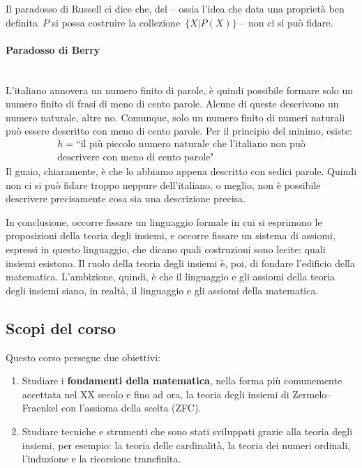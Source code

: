 Il paradosso di Russell ci dice che, del  -- ossia
l'idea che data una propriet\`a ben definita~$P$ si possa costruire la
collezione~$\{X | P(X)\}$ -- non ci si pu\`o fidare.

\paragraph*{Paradosso di Berry}\mbox{}\\
L'italiano annovera un numero finito di parole, \`e quindi possibile formare solo un numero finito di frasi di meno di cento parole. Alcune di queste descrivono un numero naturale, altre no. Comunque, solo un numero 
finito di numeri naturali pu\`o essere descritto con meno di cento parole. Per il principio del minimo, esiste:
\begin{align*}
	h = \text{``il pi\`u piccolo numero naturale che l'italiano non pu\`o} \\ 
 \text{descrivere con meno di cento parole"}
\end{align*}
Il guaio, chiaramente, \`e che lo abbiamo appena descritto con sedici parole.
Quindi non ci si pu\`o fidare troppo neppure dell'italiano, o meglio, non \`e possibile descrivere precisamente cosa sia una descrizione precisa.

In conclusione, occorre fissare un linguaggio formale in cui si esprimono le proposizioni della teoria degli insiemi, e occorre fissare un sistema di assiomi, espressi in questo linguaggio, che 
dicano quali costruzioni sono lecite: quali insiemi esistono. Il ruolo della teoria degli insiemi \`e, poi, di fondare l'edificio della matematica. L'ambizione, quindi, \`e che il linguaggio e gli assiomi della teoria degli insiemi siano, in realt\`a, il linguaggio e gli assiomi della matematica.

\subsection{Scopi del corso}
Questo corso persegue due obiettivi:
\begin{enumerate}[(1)]
	\item Studiare i \textbf{fondamenti della matematica}, nella forma pi\`u comunemente accettata nel XX secolo e fino ad ora, la teoria degli insiemi di
	Zermelo--Fraenkel con l'assioma della scelta (ZFC).
	\item Studiare tecniche e strumenti che sono stati sviluppati grazie alla teoria degli insiemi, per esempio: la teoria delle cardinalit\`a, la teoria dei numeri ordinali, l'induzione e la ricorsione transfinita.
\end{enumerate}

